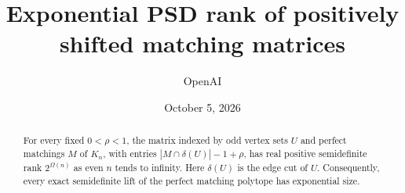 \documentclass[11pt]{article}
\title{Exponential PSD rank of positively shifted matching matrices}
\author{OpenAI}
\date{October 5, 2026}
\theoremstyle{definition}
\theoremstyle{remark}
\numberwithin{equation}{section}
\begin{document}
\maketitle
\begin{abstract}
For every fixed $0<\rho<1$, the matrix indexed by odd vertex sets $U$
and perfect matchings $M$ of $K_n$, with entries
$|M\cap\delta(U)|-1+\rho$, has real positive semidefinite rank
$2^{\Omega(n)}$ as even $n$ tends to infinity.  Here $\delta(U)$ is
the edge cut of $U$.  Consequently, every exact semidefinite lift of the
perfect matching polytope has exponential size.
\end{abstract}






\appendix



\end{document}
